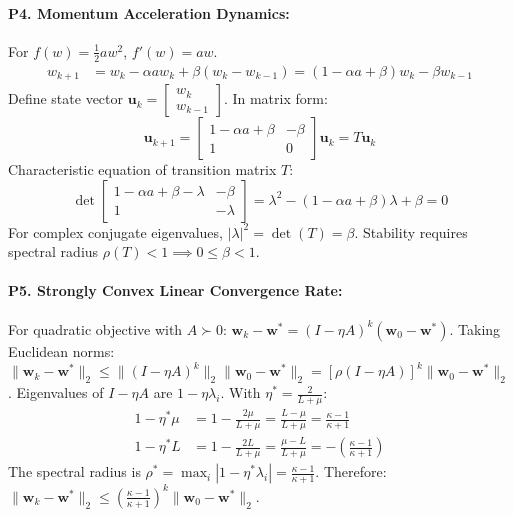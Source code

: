 \paragraph{P4. Momentum Acceleration Dynamics:}
For $f(w) = \frac{1}{2} a w^2$, $f'(w) = aw$.
\begin{align*}
w_{k+1} &= w_k - \alpha a w_k + \beta(w_k - w_{k-1}) = (1 - \alpha a + \beta)w_k - \beta w_{k-1}
\end{align*}
Define state vector $\mathbf{u}_k = \begin{bmatrix} w_k \\ w_{k-1} \end{bmatrix}$. In matrix form:
\begin{equation*}
\mathbf{u}_{k+1} = \begin{bmatrix} 1 - \alpha a + \beta & -\beta \\ 1 & 0 \end{bmatrix} \mathbf{u}_k = T \mathbf{u}_k
\end{equation*}
Characteristic equation of transition matrix $T$:
\begin{equation*}
\det\begin{bmatrix} 1 - \alpha a + \beta - \lambda & -\beta \\ 1 & -\lambda \end{bmatrix} = \lambda^2 - (1 - \alpha a + \beta)\lambda + \beta = 0
\end{equation*}
For complex conjugate eigenvalues, $|\lambda|^2 = \det(T) = \beta$. Stability requires spectral radius $\rho(T) < 1 \implies 0 \le \beta < 1$.

\paragraph{P5. Strongly Convex Linear Convergence Rate:}
For quadratic objective with $A \succ 0$: $\mathbf{w}_k - \mathbf{w}^* = (I - \eta A)^k (\mathbf{w}_0 - \mathbf{w}^*)$.
Taking Euclidean norms: $\|\mathbf{w}_k - \mathbf{w}^*\|_2 \le \|(I - \eta A)^k\|_2 \|\mathbf{w}_0 - \mathbf{w}^*\|_2 = [\rho(I - \eta A)]^k \|\mathbf{w}_0 - \mathbf{w}^*\|_2$.
Eigenvalues of $I - \eta A$ are $1 - \eta \lambda_i$.
With $\eta^* = \frac{2}{L + \mu}$:
\begin{align*}
1 - \eta^* \mu &= 1 - \frac{2\mu}{L + \mu} = \frac{L - \mu}{L + \mu} = \frac{\kappa - 1}{\kappa + 1} \\
1 - \eta^* L &= 1 - \frac{2L}{L + \mu} = \frac{\mu - L}{L + \mu} = -\left( \frac{\kappa - 1}{\kappa + 1} \right)
\end{align*}
The spectral radius is $\rho^* = \max_i |1 - \eta^* \lambda_i| = \frac{\kappa - 1}{\kappa + 1}$.
Therefore: $\|\mathbf{w}_k - \mathbf{w}^*\|_2 \le \left( \frac{\kappa - 1}{\kappa + 1} \right)^k \|\mathbf{w}_0 - \mathbf{w}^*\|_2$.

